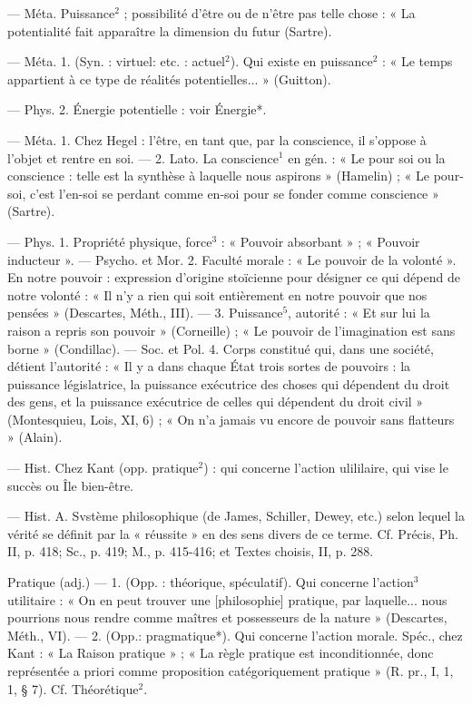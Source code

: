 \begin{itemize}[leftmargin=1cm, label=, itemsep=1pt]
 — Méta. Puissance$^2$ ; possibilité d’être ou de n'être pas telle
chose : « La potentialité fait apparaître la dimension du futur
(Sartre).

 — Méta. 1. (Syn. : virtuel:
etc. : actuel$^2$). Qui existe en puissance$^2$ : « Le temps appartient à ce
type de réalités potentielles... »
(Guitton).

— Phys. 2. Énergie potentielle :
voir Énergie*.

 — Méta. 1. Chez Hegel : l'être,
en tant que, par la conscience, il
s’oppose à l’objet et rentre en soi. —
2. Lato. La conscience$^1$ en gén. : « Le
pour soi ou la conscience : telle est
la synthèse à laquelle nous aspirons » (Hamelin) ; « Le pour-soi, c’est
l’en-soi se perdant comme en-soi
pour se fonder comme conscience »
(Sartre).

 — Phys. 1. Propriété physique, force$^3$ : « Pouvoir absorbant » ;
« Pouvoir inducteur ». — Psycho. et
Mor. 2. Faculté morale : « Le pouvoir de la volonté ». En notre pouvoir : expression d'origine stoïcienne
pour désigner ce qui
dépend de notre volonté : « Il n’y a
rien qui soit entièrement en notre
pouvoir que nos pensées » (Descartes,
Méth., III). — 3. Puissance$^5$, autorité : « Et sur lui la raison a repris
son pouvoir » (Corneille) ; « Le pouvoir de l'imagination est sans
borne » (Condillac). — Soc. et Pol.
4. Corps constitué qui, dans une
société, détient l'autorité : « Il y a
dans chaque État trois sortes de
pouvoirs : la puissance législatrice,
la puissance exécutrice des choses
qui dépendent du droit des gens, et
la puissance exécutrice de celles qui
dépendent du droit civil » (Montesquieu, Lois, XI, 6) ; « On n’a jamais
vu encore de pouvoir sans flatteurs »
(Alain).

 — Hist. Chez Kant (opp.
pratique$^2$) : qui concerne l'action
ulililaire, qui vise le succès ou Île
bien-être.

 — Hist. A. Svstème
philosophique (de James, Schiller,
Dewey, etc.) selon lequel la vérité
se définit par la « réussite » en des
sens divers de ce terme. Cf. Précis,
Ph. II, p. 418; Sc., p. 419; M.,
p. 415-416; et Textes choisis, II,
p. 288.

Pratique (adj.)\ib{} — 1. (Opp. : théorique,
spéculatif). Qui concerne l’action$^3$
utilitaire : « On en peut trouver une
[philosophie] pratique, par laquelle...
nous pourrions nous rendre comme
maîtres et possesseurs de la nature »
(Descartes, Méth., VI). — 2. (Opp.:
pragmatique*). Qui concerne l’action
morale. Spéc., chez Kant : « La Raison
pratique » ; « La règle pratique est
inconditionnée, donc représentée a
priori comme proposition catégoriquement pratique » (R. pr., I, 1,
1, § 7). Cf. Théorétique$^2$.


\end{itemize}
